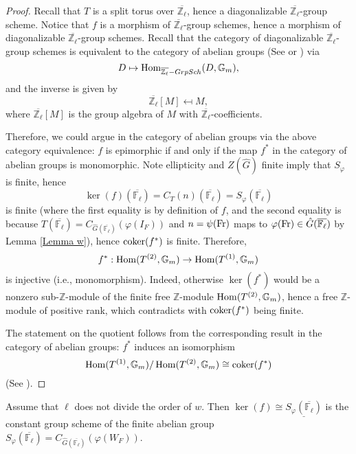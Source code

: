 \begin{proof}
	Recall that $T$ is a split torus over $\overline{\mathbb{Z}_{\ell}}$, hence a diagonalizable $\overline{\mathbb{Z}_{\ell}}$-group scheme. Notice that $f$ is a morphism of $\overline{\mathbb{Z}_{\ell}}$-group schemes, hence a morphism of diagonalizable $\overline{\mathbb{Z}_{\ell}}$-group schemes. Recall that the category of diagonalizable $\overline{\mathbb{Z}_{\ell}}$-group schemes is equivalent to the category of abelian groups (See \cite[p70, Section 5]{brochard2014autour} or \cite{conrad2014reductive}) via
	$$D \mapsto \operatorname{\operatorname{Hom}}_{\overline{\mathbb{Z}_{\ell}}-GrpSch}(D, \mathbb{G}_m),$$
	and the inverse is given by 
	$$\overline{\mathbb{Z}_{\ell}}[M] \mapsfrom M,$$
	where $\overline{\mathbb{Z}_{\ell}}[M]$ is the group algebra of $M$ with $\overline{\mathbb{Z}_{\ell}}$-coefficients.
	
	Therefore, we could argue in the category of abelian groups via the above category equivalence: $f$ is epimorphic if and only if the map $f^*$ in the category of abelian groups is monomorphic. Note ellipticity and $Z(\hat{G})$ finite imply that $S_{\varphi}$ is finite, hence 
	$$\ker(f)(\overline{\mathbb{F}_{\ell}})=C_T(n)(\overline{\mathbb{F}_{\ell}})=S_{\varphi}(\overline{\mathbb{F}_{\ell}})$$
	is finite (where the first equality is by definition of $f$, and the second equality is because $T(\overline{\mathbb{F}_{\ell}})=C_{\hat{G}(\overline{\mathbb{F}_{\ell}})}(\varphi(I_F))$ and $n = \psi(\operatorname{Fr})$ maps to $\varphi(\operatorname{Fr}) \in \hat{G}(\overline{\mathbb{F}_{\ell}})$ by Lemma \ref{Lemma w}), hence $\operatorname{coker}(f^*)$ is finite. Therefore, 
	$$f^*:\operatorname{\operatorname{Hom}}(T^{(2)}, \mathbb{G}_m) \to \operatorname{\operatorname{Hom}}(T^{(1)}, \mathbb{G}_m)$$
	is injective (i.e., monomorphism). Indeed, otherwise $\ker(f^*)$ would be a nonzero sub-$\mathbb{Z}$-module of the finite free $\mathbb{Z}$-module $\operatorname{\operatorname{Hom}}(T^{(2)}, \mathbb{G}_m)$, hence a free $\mathbb{Z}$-module of positive rank, which contradicts with $\operatorname{coker}(f^*)$ being finite.
	
	The statement on the quotient follows from the corresponding result in the category of abelian groups: $f^*$ induces an isomorphism
	$$\operatorname{\operatorname{Hom}}(T^{(1)}, \mathbb{G}_m)/\operatorname{\operatorname{Hom}}(T^{(2)}, \mathbb{G}_m) \cong \operatorname{coker}(f^*)$$
	(See \cite[p71, Subsection 5.3]{brochard2014autour}).
\end{proof}

\begin{lemma}\label{Lem ker(f)}
	Assume that $\ell$ does not divide the order of $w$. Then $\ker(f) \cong \underline{S_{\varphi}(\overline{\mathbb{F}_{\ell}})}$ is the constant group scheme of the finite abelian group $S_{\varphi}(\overline{\mathbb{F}_{\ell}})=C_{\hat{G}(\overline{\mathbb{F}_{\ell}})}(\varphi(W_F))$.
\end{lemma}

